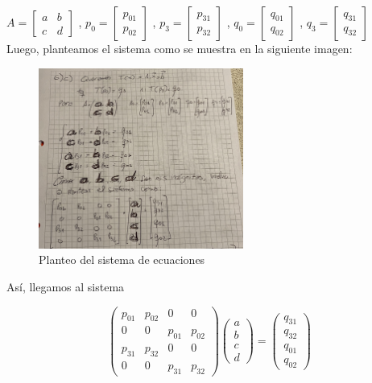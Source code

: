 \documentclass{article}
\begin{document}
$A =  
\begin{bmatrix}
a & b \\
c & d 
\end{bmatrix}$ ,  
$p_0 =  
\begin{bmatrix}
p_{01} \\
p_{02} 
\end{bmatrix}$ , 
$p_3 =  
\begin{bmatrix}
p_{31} \\
p_{32} 
\end{bmatrix}$ , 
$q_0 =  
\begin{bmatrix}
q_{01} \\
q_{02} 
\end{bmatrix}$ , 
$q_3 =  
\begin{bmatrix}
q_{31} \\
q_{32} 
\end{bmatrix}$ \\

Luego, planteamos el sistema como se muestra en la siguiente imagen:

\begin{figure}[H]
    \centering
    \includegraphics[width=0.6\textwidth]{imagenes/6c.jpg}
    \caption{Planteo del sistema de ecuaciones}
    \label{fig:ejemplo}
\end{figure}

Así, llegamos al sistema 

$$
\begin{pmatrix}
p_{01} & p_{02} & 0 & 0 \\
0 & 0 & p_{01} & p_{02} \\
p_{31} & p_{32} & 0 & 0 \\
0 & 0 & p_{31} & p_{32}
\end{pmatrix}
\begin{pmatrix}
a \\
b \\
c \\
d
\end{pmatrix}
=
\begin{pmatrix}
q_{31} \\
q_{32} \\
q_{01} \\
q_{02}
\end{pmatrix}
$$\\
\end{document}
